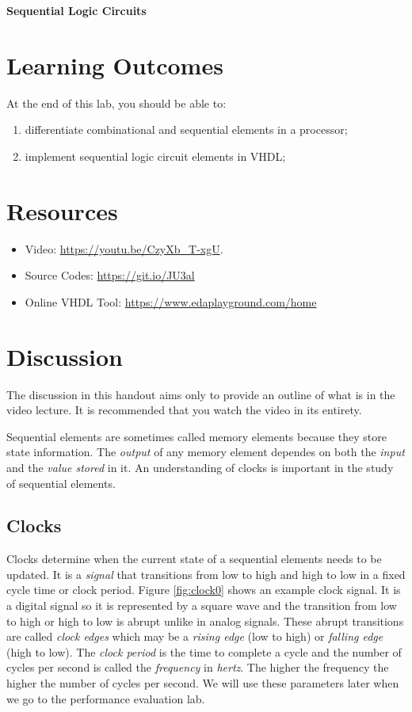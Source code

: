 \documentclass[a4paper, 11pt,oneside]{article}
\begin{document}
\begin{center}
	{\LARGE \textbf{Sequential Logic Circuits}}
\end{center}

\section*{Learning Outcomes}
   At the end of this lab, you should be able to:
   \begin{enumerate}[itemsep=0pt,parsep=0pt]
   	   \item differentiate combinational and sequential elements in a processor;
       \item implement sequential logic circuit elements in VHDL;
   \end{enumerate}   
\tableofcontents

\section{Resources}
\begin{itemize}
	\item Video: \href{https://youtu.be/CzyXb_T-xgU}{https://youtu.be/CzyXb\_T-xgU}.
	\item Source Codes: \href{https://git.io/JU3al}{https://git.io/JU3al}
	\item Online VHDL Tool: \href{https://www.edaplayground.com/home}
	{https://www.edaplayground.com/home}
\end{itemize}	

\section{Discussion}
The discussion in this handout aims only to provide an outline of what is in 
the video lecture. It is recommended that you watch the video in its entirety.

Sequential elements are sometimes called memory elements because they store 
state information. The\textit{ output} of any memory element dependes on both 
the \textit{input} and the \textit{value stored} in it. An understanding of 
clocks is important in the study of sequential elements. 

\subsection{Clocks}
Clocks determine when the current state of a sequential elements needs to be
updated. It is a \textit{signal} that transitions from low to high and high to
low in a fixed cycle time or clock period. Figure \ref{fig:clock0} shows an
example clock signal. It is a digital signal so it is represented by a square 
wave and the transition from low to high or high to low is abrupt unlike in 
analog signals. These abrupt transitions are called \textit{clock edges} which 
may be a \textit{rising edge} (low to high) or \textit{falling edge} (high to
low). The \textit{clock period} is the time to complete a cycle and the number 
of cycles per second is called the \textit{frequency} in \textit{hertz}. The 
higher the frequency the higher the number of cycles per second. We will use 
these parameters later when we go to the performance evaluation lab. 
\end{document}

